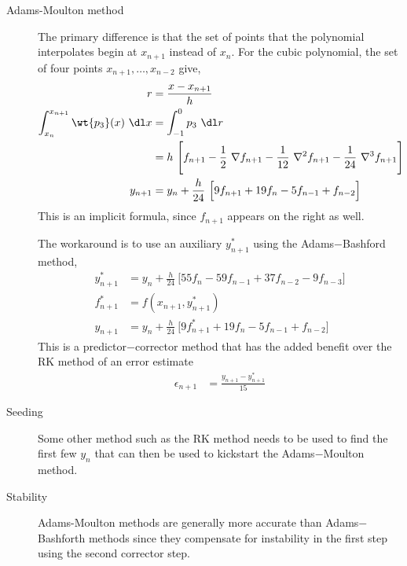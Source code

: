\begin{description}
    \item[Adams-Moulton method] The primary difference is that the set of points that
        the polynomial interpolates begin at $ x_{n+1} $ instead of $ x_n $. For the
        cubic polynomial, the set of four points $ x_{n+1},\dots,x_{n-2} $ give,
        \begin{align}
            r                                       & = \frac{x - x_{n+1}}{h}    \\
            \int_{x_n}^{x_{n+1}} \wt{p_3}(x)\ \dl x & = \int_{-1}^{0} p_3\ \dl r \\
                                                    & = h\ \Bigg[ f_{n+1}
                - \frac{1}{2}\ \nabla f_{n+1} - \frac{1}{12}\ \nabla^2 f_{n+1}
            - \frac{1}{24}\ \nabla^3 f_{n+1} \Bigg]                              \\
            y_{n+1}                                 & = y_n + \frac{h}{24}
            \ \Big[ 9f_{n+1} + 19 f_n - 5f_{n-1} + f_{n-2} \Big]
        \end{align}
        This is an implicit formula, since $ f_{n+1} $ appears on the right as well. \par
        The workaround is to use an auxiliary $ y^*_{n+1} $ using the Adams$-$Bashford
        method,
        \begin{align}
            y^*_{n+1} & = y_n + \frac{h}{24}
            \ \Big[ 55 f_n - 59f_{n-1} +37f_{n-2} - 9f_{n-3} \Big] \\
            f^*_{n+1} & = f(x_{n+1}, y^*_{n+1})                    \\
            y_{n+1}   & = y_n + \frac{h}{24}
            \ \Big[ 9f^*_{n+1} + 19 f_n - 5f_{n-1} + f_{n-2} \Big]
        \end{align}
        This is a predictor$-$corrector method that has the added benefit over the RK
        method of an error estimate
        \begin{align}
            \epsilon_{n+1} & = \frac{y_{n+1} - y^*_{n+1}}{15}
        \end{align}

    \item[Seeding] Some other method such as the RK method needs to be used to find
        the first few $ y_n $ that can then be used to kickstart the Adams$-$Moulton
        method.

    \item[Stability] Adams-Moulton methods are generally more accurate than
        Adams$-$Bashforth methods since they compensate for instability in the first step
        using the second corrector step.
\end{description}

